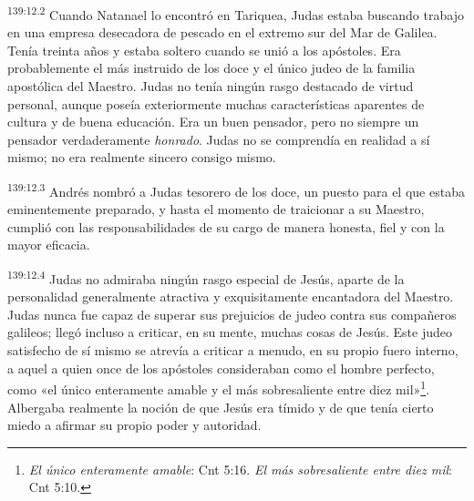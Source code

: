 \par 
\textsuperscript{139:12.2} Cuando Natanael lo encontró en Tariquea, Judas estaba buscando trabajo en una empresa desecadora de pescado en el extremo sur del Mar de Galilea. Tenía treinta años y estaba soltero cuando se unió a los apóstoles. Era probablemente el más instruido de los doce y el único judeo de la familia apostólica del Maestro. Judas no tenía ningún rasgo destacado de virtud personal, aunque poseía exteriormente muchas características aparentes de cultura y de buena educación. Era un buen pensador, pero no siempre un pensador verdaderamente \textit{honrado}. Judas no se comprendía en realidad a sí mismo; no era realmente sincero consigo mismo.

\par 
\textsuperscript{139:12.3} Andrés nombró a Judas tesorero de los doce, un puesto para el que estaba eminentemente preparado, y hasta el momento de traicionar a su Maestro, cumplió con las responsabilidades de su cargo de manera honesta, fiel y con la mayor eficacia.

\par 
\textsuperscript{139:12.4} Judas no admiraba ningún rasgo especial de Jesús, aparte de la personalidad generalmente atractiva y exquisitamente encantadora del Maestro. Judas nunca fue capaz de superar sus prejuicios de judeo contra sus compañeros galileos; llegó incluso a criticar, en su mente, muchas cosas de Jesús. Este judeo satisfecho de sí mismo se atrevía a criticar a menudo, en su propio fuero interno, a aquel a quien once de los apóstoles consideraban como el hombre perfecto, como «el único enteramente amable y el más sobresaliente entre diez mil»\footnote{\textit{El único enteramente amable}: Cnt 5:16. \textit{El más sobresaliente entre diez mil}: Cnt 5:10.}. Albergaba realmente la noción de que Jesús era tímido y de que tenía cierto miedo a afirmar su propio poder y autoridad.

